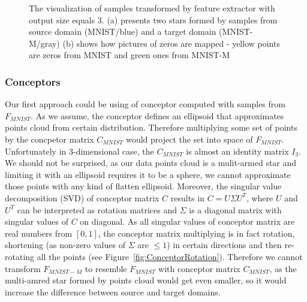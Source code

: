\documentclass{article}
\begin{document}
\begin{figure}[htb]%
    \centering
    \qquad
    \caption{The visualization of samples transformed by feature extractor with output size equals 3. (a) presents two stars formed by samples from source domain (MNIST/blue) and a target domain (MNIST-M/gray) (b) shows how pictures of zeros are mapped - yellow points are zeros from MNIST and green ones from MNIST-M}%
    \label{fig:MNIST_3D}%
\end{figure}

\subsubsection{Conceptors}
\par
Our first approach could be using of conceptor computed with samples from $F_{MNIST}$. As we assume, the conceptor defines an ellipsoid that approximates points cloud from certain distribution. Therefore multiplying some set of points by the concpetor matrix $C_{MNIST}$ would project the set into space of $F_{MNIST}$. Unfortunately in 3-dimensional case, the $C_{MNIST}$ is almost an identity matrix $I_{3}$. We should not be surprised, as our data points cloud is a mulit-armed star and limiting it with an ellipsoid requires it to be a sphere, we cannot approximate those points with any kind of flatten ellipsoid. Moreover, the singular value decomposition (SVD) of conceptor matrix $C$ results in $C = U\Sigma U^{T}$, where $U$ and $U^{T}$ can be interpreted as rotation matrices and $\Sigma$ is a diagonal matrix with singular values of $C$ on diagonal. As all singular values of conceptor matrix are real numbers from $[0,1]$, the conceptor matrix multiplying is in fact rotation, shortening (as non-zero values of $\Sigma$ are $\leq 1$) in certain directions and then re-rotating all the points (see Figure~\ref{fig:ConceptorRotation}). Therefore we cannot transform $F_{MNIST-M}$ to resemble $F_{MNIST}$ with conceptor matrix $C_{MNIST}$, as the multi-amred star formed by points cloud would get even smaller, so it would increase the difference between source and target domains.
\end{document}
